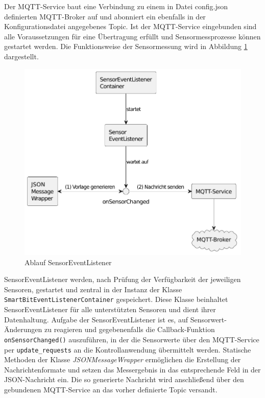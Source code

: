 \documentclass[11pt,a4paper]{report}
\begin{document}
Der MQTT-Service baut eine Verbindung zu einem in Datei config.json definierten MQTT-Broker auf und abonniert ein ebenfalls in der Konfigurationsdatei angegebenes Topic.
Ist der MQTT-Service eingebunden sind alle Voraussetzungen für eine Übertragung erfüllt und  Sensormessprozesse können gestartet werden.
Die Funktionsweise der Sensormessung wird in Abbildung \ref{fig:sensor_event_listener} dargestellt.
\begin{figure}[htbp]
  \centering
  \includegraphics[width=.8\textwidth]{images/sensor_event_listener}
  \caption{Ablauf SensorEventListener}
  \label{fig:sensor_event_listener}
\end{figure}
SensorEventListener werden, nach Prüfung der Verfügbarkeit der jeweiligen Sensoren, gestartet und zentral in der Instanz der Klasse \texttt{SmartBitEventListenerContainer} gespeichert.
Diese Klasse beinhaltet SensorEventListener für alle unterstützten Sensoren und dient ihrer Datenhaltung.
Aufgabe der SensorEventListener ist es, auf Sensorwert-Änderungen zu reagieren und gegebenenfalls die Callback-Funktion \texttt{onSensorChanged()} auszuführen, in der die Sensorwerte über den MQTT-Service per \texttt{update\_requests} an die Kontrollanwendung übermittelt werden.
Statische Methoden der Klasse \textit{JSONMessageWrapper} ermöglichen die Erstellung der Nachrichtenformate und setzen das Messergebnis in das entsprechende Feld in der JSON-Nachricht ein.
Die so generierte Nachricht wird anschließend über den gebundenen MQTT-Service an das vorher definierte Topic versandt.
\end{document}
